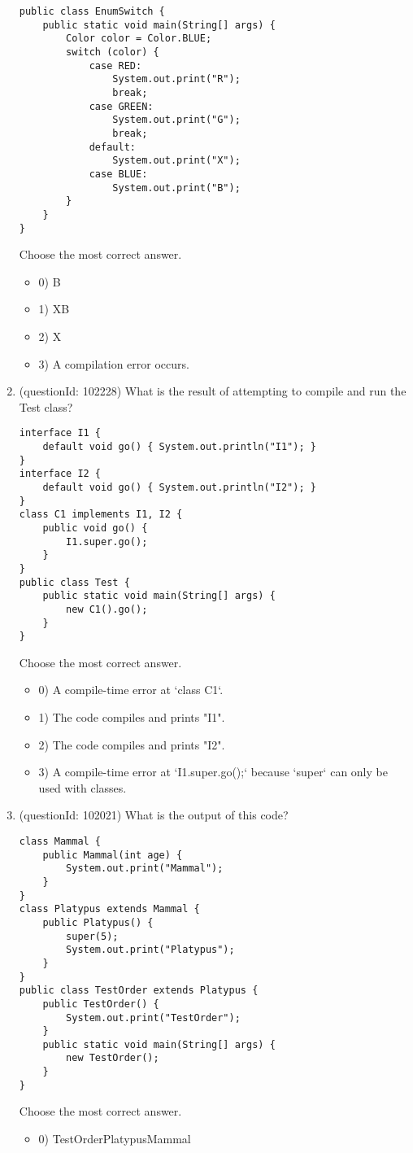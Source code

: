 \documentclass[12pt]{article}
\begin{document}
\begin{enumerate}[label=(\arabic*)]
\begin{verbatim}
public class EnumSwitch {
    public static void main(String[] args) {
        Color color = Color.BLUE;
        switch (color) {
            case RED:
                System.out.print("R");
                break;
            case GREEN:
                System.out.print("G");
                break;
            default:
                System.out.print("X");
            case BLUE:
                System.out.print("B");
        }
    }
}
\end{verbatim}
Choose the most correct answer. 
\begin{itemize}
\item 0) B

\item 1) XB

\item 2) X

\item 3) A compilation error occurs.

\end{itemize}
\item (questionId: 102228) What is the result of attempting to compile and run the Test class?\n\begin{verbatim}
interface I1 {
    default void go() { System.out.println("I1"); }
}
interface I2 {
    default void go() { System.out.println("I2"); }
}
class C1 implements I1, I2 {
    public void go() {
        I1.super.go();
    }
}
public class Test {
    public static void main(String[] args) {
        new C1().go();
    }
}
\end{verbatim}
Choose the most correct answer. 
\begin{itemize}
\item 0) A compile-time error at `class C1`.

\item 1) The code compiles and prints "I1".

\item 2) The code compiles and prints "I2".

\item 3) A compile-time error at `I1.super.go();` because `super` can only be used with classes.

\end{itemize}
\item (questionId: 102021) What is the output of this code?
\begin{verbatim}
class Mammal {
    public Mammal(int age) {
        System.out.print("Mammal");
    }
}
class Platypus extends Mammal {
    public Platypus() {
        super(5);
        System.out.print("Platypus");
    }
}
public class TestOrder extends Platypus {
    public TestOrder() {
        System.out.print("TestOrder");
    }
    public static void main(String[] args) {
        new TestOrder();
    }
}
\end{verbatim}
Choose the most correct answer. 
\begin{itemize}
\item 0) TestOrderPlatypusMammal


\end{itemize}
\end{enumerate}
\end{document}
